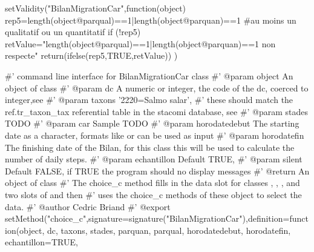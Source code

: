 setValidity("BilanMigrationCar",function(object)
		{
			rep5=length(object@parqual)==1|length(object@parquan)==1 #au moins un qualitatif ou un quantitatif
			if (!rep5) retValue="length(object@parqual)==1|length(object@parquan)==1 non respecte"  
			return(ifelse(rep5,TRUE,retValue))
		}   )


#' command line interface for BilanMigrationCar class
#' @param object An object of class 
#' @param dc A numeric or integer, the code of the dc, coerced to integer,see 
#' @param taxons '2220=Salmo salar',
#' these should match the ref.tr_taxon_tax referential table in the stacomi database, see 
#' @param stades TODO
#' @param car Sample TODO
#' @param horodatedebut The starting date as a character, formats like  or  can be used as input
#' @param horodatefin The finishing date of the Bilan, for this class this will be used to calculate the number of daily steps.
#' @param echantillon Default TRUE, 
#' @param silent Default FALSE, if TRUE the program should no display messages
#' @return An object of class 
#' The choice_c method fills in the data slot for classes , , ,  and two slots of  and then 
#' uses the choice_c methods of these object to select the data.
#' @author Cedric Briand 
#' @export
setMethod("choice_c",signature=signature("BilanMigrationCar"),definition=function(object,
				dc,
				taxons,
				stades,
				parquan,
				parqual,
				horodatedebut,
				horodatefin,
				echantillon=TRUE,
